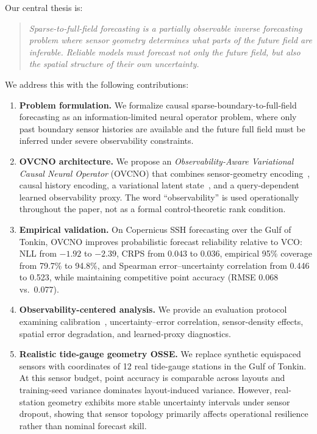 \documentclass[11pt,a4paper]{article}
\begin{document}
Our central thesis is:
\begin{quote}
\emph{Sparse-to-full-field forecasting is a partially observable inverse forecasting problem where sensor geometry determines what parts of the future field are inferable. Reliable models must forecast not only the future field, but also the spatial structure of their own uncertainty.}
\end{quote}

We address this with the following contributions:
\begin{enumerate}
    \item \textbf{Problem formulation.} We formalize causal sparse-boundary-to-full-field forecasting as an information-limited neural operator problem, where only past boundary sensor histories are available and the future full field must be inferred under severe observability constraints.

    \item \textbf{OVCNO architecture.} We propose an \emph{Observability-Aware Variational Causal Neural Operator} (OVCNO) that combines sensor-geometry encoding~\cite{zaheer2017deepsets}, causal history encoding, a variational latent state~\cite{kingma2013vae}, and a query-dependent learned observability proxy. The word ``observability'' is used operationally throughout the paper, not as a formal control-theoretic rank condition.

    \item \textbf{Empirical validation.} On Copernicus SSH forecasting over the Gulf of Tonkin, OVCNO improves probabilistic forecast reliability relative to VCO: NLL from $-1.92$ to $-2.39$, CRPS from 0.043 to 0.036, empirical 95\% coverage from 79.7\% to 94.8\%, and Spearman error--uncertainty correlation from 0.446 to 0.523, while maintaining competitive point accuracy (RMSE 0.068 vs.\ 0.077).

    \item \textbf{Observability-centered analysis.} We provide an evaluation protocol examining calibration~\cite{gneiting2007calibration}, uncertainty--error correlation, sensor-density effects, spatial error degradation, and learned-proxy diagnostics.

    \item \textbf{Realistic tide-gauge geometry OSSE.} We replace synthetic equispaced sensors with coordinates of 12 real tide-gauge stations in the Gulf of Tonkin. At this sensor budget, point accuracy is comparable across layouts and training-seed variance dominates layout-induced variance. However, real-station geometry exhibits more stable uncertainty intervals under sensor dropout, showing that sensor topology primarily affects operational resilience rather than nominal forecast skill.
\end{enumerate}
\end{document}
